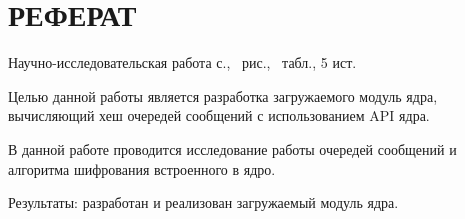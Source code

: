 \section*{\large РЕФЕРАТ}

Научно-исследовательская работа \pageref{LastPage} с., \totalfigures\ рис., \totaltables\ табл., 5 ист.


Целью данной работы является разработка загружаемого модуль ядра, вычисляющий хеш очередей сообщений с использованием API ядра.

В данной работе проводится исследование работы очередей сообщений и алгоритма шифрования встроенного в ядро.

Результаты: разработан и реализован загружаемый модуль ядра.


\pagebreak